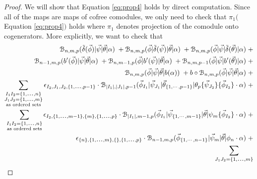 \begin{proof}
We will show that Equation \ref{eq:prop4} 
holds by direct computation. Since all of 
the maps are maps of cofree comodules, we 
only need to check that $\pi_1($
Equation \ref{eq:prop4}$)$ holds where 
$\pi_1$ denotes projection of the comodule 
onto cogenerators. More explicitly, we 
want to check that
\begin{equation} \label{eq:prop4_expand}
\begin{aligned}
\mathcal{B}_{n, m, p} ( \tilde{\delta}(\vec{\phi}) | \vec{\psi} | \vec{\theta} | \alpha ) \; + 
\mathcal{B}_{n, m, p} ( \vec{\phi} | \tilde{\delta}(\vec{\psi}) | \vec{\theta} | \alpha ) \; + 
\mathcal{B}_{n, m, p} ( \vec{\phi} | \vec{\psi} | \tilde{\delta}(\vec{\theta}) | \alpha ) \; + \\
\mathcal{B}_{n-1, m, p} ( b^\prime(\vec{\phi}) | \vec{\psi} | \vec{\theta} | \alpha ) \; + 
\mathcal{B}_{n, m-1, p} ( \vec{\phi} | b^\prime(\vec{\psi}) | \vec{\theta} | \alpha ) \; + 
\mathcal{B}_{n, m, p-1} ( \vec{\phi} | \vec{\psi} | b^\prime(\vec{\theta}) | \alpha ) \; + \\
\mathcal{B}_{n, m, p} ( \vec{\phi} | \vec{\psi} | \vec{\theta} | b(\alpha) ) \; + 
b \circ \mathcal{B}_{n, m, p} ( \vec{\phi} | \vec{\psi} | \vec{\theta} | \alpha ) \; + \\
\sum \limits_{\substack{
  I_1I_2 = \{1,\smdots,n\}\\
  J_1J_2 = \{1,\smdots,m\}\\
  \textrm{as ordered sets}}}
  \epsilon_{I_2, J_1,J_2,\{1,\smdots,p-1\}} \cdot
 \mathcal{B}_{|I_1|, |J_1|, p-1}(\vec{\phi}_{I_1} | \vec{\psi}_{J_1} | \vec{\theta}_{\{1,\cdots, p-1\}} |
     \theta_{p} \{\vec{\psi}_{J_2}\} \{\vec{\phi}_{I_2}\} \cdot \alpha ) \; + \\
%
\sum \limits_{\substack{
  I_1I_2 = \{1,\smdots,n\}\\
  \textrm{as ordered sets}}}
  \epsilon_{I_2,\{1,\smdots,m-1\},\{m\},\{1,\smdots,p\}} \cdot   
 \mathcal{B}_{|I_1|, m-1, p}(\vec{\phi}_{I_1} | \vec{\psi}_{\{1,\cdots, m-1\}} | \vec{\theta} |
     \psi_{m} \{\vec{\phi}_{I_2}\}\cdot \alpha ) \; + \\
%     
\epsilon_{\{n\},\{1,\smdots,m\},\{\},\{1,\smdots,p\}}\cdot
\mathcal{B}_{n-1, m, p}(\vec{\phi}_{\{1,\cdots, n-1\}} |\vec{\psi}_{m} | \vec{\theta} | 
     \phi_{n} \cdot \alpha) \; + \\
\sum \limits_{\substack{
  J_1J_2 = \{1,\smdots,m\}\\
}}
\end{aligned}
\end{equation}
\end{proof}
